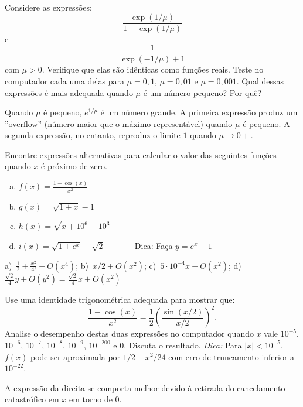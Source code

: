 \begin{exer} Considere as expressões:
  \begin{equation}
    \frac{\exp(1/\mu)}{1+\exp(1/\mu)}
  \end{equation}
e
\begin{equation}
  \frac{1}{\exp(-1/\mu)+1}
\end{equation}
com $\mu>0$. Verifique que elas são idênticas como funções reais. Teste no computador cada uma delas para $\mu=0,1$, $\mu=0,01$ e $\mu=0,001$. Qual dessas expressões é mais adequada quando $\mu$ é um número pequeno? Por quê?
\end{exer}
\begin{resp}
  Quando $\mu$ é pequeno, $e^{1/\mu}$ é um número grande. A primeira expressão produz um ''overflow'' (número maior que o máximo representável) quando $\mu$ é pequeno. A segunda expressão, no entanto, reproduz o limite $1$ quando $\mu\to 0+$.
\end{resp}

\begin{exer} Encontre expressões alternativas para calcular o valor das seguintes funções quando $x$ é próximo de zero.
\begin{enumerate}[a)]
\item $f(x)=\frac{1-\cos(x)}{x^2}$
\item $g(x)=\sqrt{1+x}-1$
\item $h(x)=\sqrt{x+10^6}-10^3$
\item $i(x)=\sqrt{1+e^{x}}-\sqrt{2}$ ~~~~~~ Dica: Faça $y=e^{x}-1$
\end{enumerate}
\end{exer}
\begin{resp}
    a)~$\frac{1}{2}+\frac{x^2}{4!}+O(x^4)$; b)~$x/2+O(x^2)$; c)~$5\cdot 10^{-4}x+O(x^2)$; d)~$\frac{\sqrt{2}}{4}y+O(y^{2})=\frac{\sqrt{2}}{4}x+O(x^2)$
\end{resp}

\begin{exer} Use uma identidade trigonométrica adequada para mostrar que:
  \begin{equation}
    \frac{1-\cos(x)}{x^2}= \frac{1}{2} \left(\frac{\sin(x/2)}{x/2}\right)^2.
  \end{equation}
Analise o desempenho destas duas expressões no computador quando $x$ vale $10^{-5}$, $10^{-6}$, $10^{-7}$, $10^{-8}$, $10^{-9}$, $10^{-200}$ e $0$. Discuta o resultado.
\emph{Dica:} Para $|x|<10^{-5}$, $f(x)$ pode ser aproximada por $1/2-x^2/24$ com erro de truncamento inferior a $10^{-22}$.
\end{exer}
\begin{resp}
 A expressão da direita se comporta melhor devido à retirada do cancelamento catastrófico em $x$ em torno de $0$.
\end{resp}


